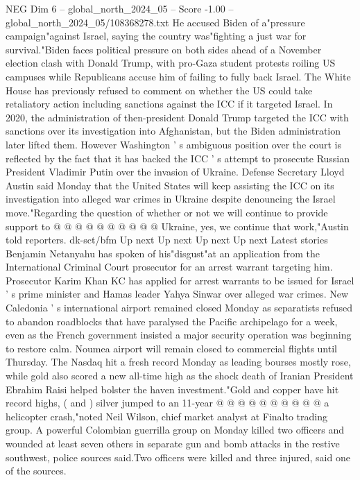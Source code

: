\begin{textsample}{NEG Dim 6 – global\_north\_2024\_05 – Score -1.00 – global\_north\_2024\_05/108368278.txt}  \label{ex:f6_neg_298}
He accused Biden of a"pressure campaign"against Israel, saying the country was"fighting a just war for survival."Biden faces political pressure on both sides ahead of a November election clash with Donald Trump, with pro-Gaza student protests roiling US campuses while Republicans accuse him of failing to fully back Israel.
The White House has previously refused to comment on whether the US could take retaliatory action including sanctions against the ICC if it targeted Israel.
In 2020, the administration of then-president Donald Trump targeted the ICC with sanctions over its investigation into Afghanistan, but the Biden administration later lifted them.
However Washington ' s ambiguous position over the court is reflected by the fact that it has backed the ICC ' s attempt to prosecute Russian President Vladimir Putin over the invasion of Ukraine.
Defense Secretary Lloyd Austin said Monday that the United States will keep assisting the ICC on its investigation into alleged war crimes in Ukraine despite denouncing the Israel move."Regarding the question of whether or not we will continue to provide support to @ @ @ @ @ @ @ @ @ @ Ukraine, yes, we continue that work,"Austin told reporters. dk-sct/bfm Up next Up next Up next Up next Latest stories Benjamin Netanyahu has spoken of his"disgust"at an application from the International Criminal Court prosecutor for an arrest warrant targeting him.
Prosecutor Karim Khan KC has applied for arrest warrants to be issued for Israel ' s prime minister and Hamas leader Yahya Sinwar over alleged war crimes.
New Caledonia ' s international airport remained closed Monday as separatists refused to abandon roadblocks that have paralysed the Pacific archipelago for a week, even as the French government insisted a major security operation was beginning to restore calm.
Noumea airport will remain closed to commercial flights until Thursday.
The Nasdaq hit a fresh record Monday as leading bourses mostly rose, while gold also scored a new all-time high as the shock death of Iranian President Ebrahim Raisi helped bolster the haven investment."Gold and copper have hit record highs, ( and ) silver jumped to an 11-year @ @ @ @ @ @ @ @ @ @ a helicopter crash,"noted Neil Wilson, chief market analyst at Finalto trading group.
A powerful Colombian guerrilla group on Monday killed two officers and wounded at least seven others in separate gun and bomb attacks in the restive southwest, police sources said.Two officers were killed and three injured, said one of the sources.

\end{textsample}
